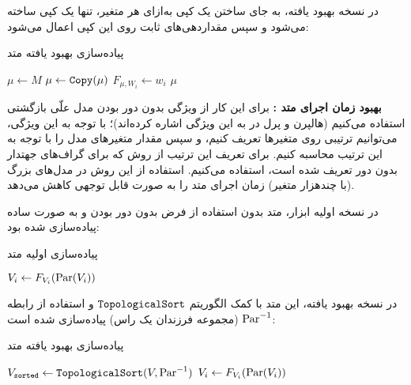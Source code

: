 در نسخه بهبود یافته،
به جای ساختن یک کپی به‌ازای هر متغیر،
تنها یک کپی ساخته می‌شود و سپس مقداردهی‌های ثابت
روی این کپی اعمال می‌شود:

\begin{algorithm}
  \caption{پیاده‌سازی بهبود یافته متد
  }
  \begin{latin}
  \begin{algorithmic}[1]
    \State $\mu \gets M$
    \State $\mu \gets \operatorname{\texttt{Copy}}(\mu)$ 
      \State $F_{\mu,W_i} \gets w_i$
    \EndFor
    \State \Return $\mu$
  \end{algorithmic}
  \end{latin}
\end{algorithm}

\textbf{بهبود زمان اجرای متد
:}
برای این کار
از ویژگی بدون دور بودن مدل علّی بازگشتی استفاده می‌کنیم
(هالپرن و پرل در
\cite{halpern2001causes}
به این ویژگی اشاره کرده‌اند)؛
با توجه به این ویژگی، می‌توانیم ترتیبی روی متغیرها
تعریف کنیم، و سپس مقدار متغیرهای مدل را
با توجه به این ترتیب محاسبه کنیم.
برای تعریف این ترتیب از روش
که برای گراف‌های جهتدار بدون دور تعریف شده است، استفاده می‌کنیم.
استفاده از این روش در مدل‌های بزرگ
(با چندهزار متغیر)
زمان اجرای متد
را به صورت قابل توجهی کاهش می‌دهد.

در نسخه اولیه ابزار، متد
بدون استفاده از فرض بدون دور بودن
و به صورت ساده پیاده‌سازی شده بود:

\begin{algorithm}
  \caption{پیاده‌سازی اولیه متد
  }
  \begin{latin}
  \begin{algorithmic}[1]
        \State $V_i \gets F_{V_i}(\operatorname{Par}(V_i))$
      \EndFor
    \EndFor
  \end{algorithmic}
  \end{latin}
\end{algorithm}

در نسخه بهبود یافته، این متد با کمک الگوریتم
$\operatorname{\texttt{TopologicalSort}}$
و استفاده از رابطه
$\operatorname{Par}^{-1}$
(مجموعه فرزندان یک راس)
پیاده‌سازی شده است:

\begin{algorithm}
  \caption{پیاده‌سازی بهبود یافته متد
  }
  \begin{latin}
  \begin{algorithmic}[1]
    \State $V_{\texttt{sorted}} \gets \operatorname{\texttt{TopologicalSort}}(V, \operatorname{Par}^{-1})$
      \State $V_i \gets F_{V_i}(\operatorname{Par}(V_i))$
    \EndFor
  \end{algorithmic}
  \end{latin}
\end{algorithm}

